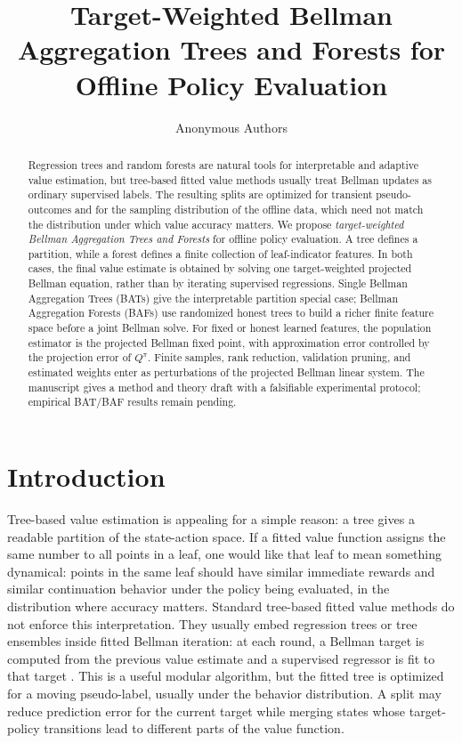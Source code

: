 \documentclass{article}
\title{Target-Weighted Bellman Aggregation Trees and Forests for Offline Policy Evaluation}
\author{%
  Anonymous Authors
}
\theoremstyle{plain}
\theoremstyle{definition}
\theoremstyle{remark}
\begin{document}
\maketitle

\begin{abstract}
Regression trees and random forests are natural tools for interpretable and
adaptive value estimation, but tree-based fitted value methods usually treat
Bellman updates as ordinary supervised labels. The resulting splits are
optimized for transient pseudo-outcomes and for the sampling distribution of
the offline data, which need not match the distribution under which value
accuracy matters. We propose \emph{target-weighted Bellman Aggregation Trees
and Forests} for offline policy evaluation. A tree defines a partition, while a
forest defines a finite collection of leaf-indicator features. In both cases,
the final value estimate is obtained by solving one target-weighted projected
Bellman equation, rather than by iterating supervised regressions. Single
Bellman Aggregation Trees (BATs) give the interpretable partition special case;
Bellman Aggregation Forests (BAFs) use randomized honest trees to build a
richer finite feature space before a joint Bellman solve. For fixed or honest
learned features, the population estimator is the projected Bellman fixed
point, with approximation error controlled by the projection error of
\(Q^\pi\). Finite samples, rank reduction, validation pruning, and estimated
weights enter as perturbations of the projected Bellman linear system. The
manuscript gives a method and theory draft with a falsifiable experimental
protocol; empirical BAT/BAF results remain pending.
\end{abstract}

\section{Introduction}

Tree-based value estimation is appealing for a simple reason: a tree gives a
readable partition of the state-action space. If a fitted value function
assigns the same number to all points in a leaf, one would like that leaf to
mean something dynamical: points in the same leaf should have similar immediate
rewards and similar continuation behavior under the policy being evaluated, in
the distribution where accuracy matters. Standard tree-based fitted value
methods do not enforce this interpretation. They usually embed regression
trees or tree ensembles inside fitted Bellman iteration: at each round, a
Bellman target is computed from the previous value estimate and a supervised
regressor is fit to that target \citep{ernst2005tree,munos2008finite}. This is
a useful modular algorithm, but the fitted tree is optimized for a moving
pseudo-label, usually under the behavior distribution. A split may reduce
prediction error for the current target while merging states whose
target-policy transitions lead to different parts of the value function.
\end{document}
